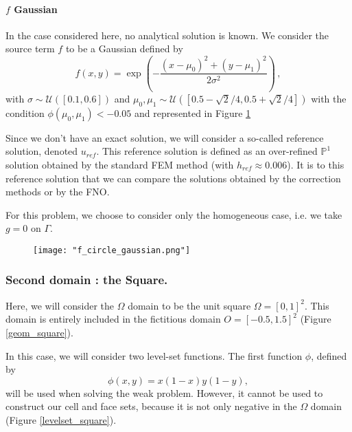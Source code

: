 \paragraph{$f$ Gaussian} \label{Corr.pb.circle.2}

In the case considered here, no analytical solution is known. We consider the source term $f$ to be a Gaussian defined by
\begin{equation*}
	f(x,y) = \exp\left(-\frac{(x-\mu_0)^2 + (y-\mu_1)^2}{2\sigma^2}\right)\,,
\end{equation*} 
with $\sigma \sim \mathcal{U}([0.1,0.6])$ and $\mu_0, \mu_1 \sim \mathcal{U}([0.5-\sqrt{2}/4, 0.5+\sqrt{2}/4])$ with the condition $\phi(\mu_0, \mu_1) < -0.05$ and represented in Figure \ref{f_circle_gaussian}

Since we don't have an exact solution, we will consider a so-called reference solution, denoted $u_{ref}$. This reference solution is defined as an over-refined $\mathbb{P}^1$ solution obtained by the standard FEM method (with $h_{ref}\approx 0.006$). It is to this reference solution that we can compare the solutions obtained by the correction methods or by the FNO.

\begin{Rem}
	For this problem, we choose to consider only the homogeneous case, i.e. we take $g=0$ on $\Gamma$.
\end{Rem}

\begin{figure}[H]
	\centering
	\texttt{[image: "f\_circle\_gaussian.png"]}
	\label{f_circle_gaussian}
\end{figure} 

\subsubsection{Second domain : the Square.} \label{Corr.pb.square}

Here, we will consider the $\Omega$ domain to be the unit square $\Omega=[0,1]^2$. This domain is entirely included in the fictitious domain $O=[-0.5,1.5]^2$ (Figure \ref{geom_square}).

In this case, we will consider two level-set functions. The first function $\phi$, defined by
\begin{equation*}
	\phi(x,y)=x(1-x)y(1-y),
\end{equation*}
will be used when solving the weak problem. However, it cannot be used to construct our cell and face sets, because it is not only negative in the $\Omega$ domain (Figure \ref{levelset_square}).


